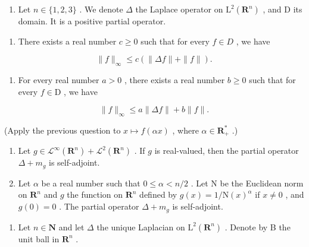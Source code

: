 \begin{enumerate}
\def\labelenumi{\arabic{enumi})}
\setcounter{enumi}{13}
\tightlist
\item
  Let \(n \in \{1, 2, 3\}\) . We denote \(\Delta\) the Laplace operator on \(\mathrm{L}^2(\mathbf{R}^n)\) , and D its domain. It is a positive partial operator.
\end{enumerate}

\begin{enumerate}
\def\labelenumi{\alph{enumi})}
\tightlist
\item
  There exists a real number \(c \geqslant 0\) such that for every \(f \in D\) , we have
\end{enumerate}

\[
\| f \| _ {\infty} \leqslant c (\| \Delta f \| + \| f \|).
\]

\begin{enumerate}
\def\labelenumi{\alph{enumi})}
\setcounter{enumi}{1}
\tightlist
\item
  For every real number \(a > 0\) , there exists a real number \(b \geqslant 0\) such that for every \(f \in \mathrm{D}\) , we have
\end{enumerate}

\[
\| f \| _ {\infty} \leqslant a \| \Delta f \| + b \| f \|.
\]

(Apply the previous question to \(x \mapsto f(\alpha x)\) , where \(\alpha \in \mathbf{R}_{+}^{*}\) .)

\begin{enumerate}
\def\labelenumi{\alph{enumi})}
\setcounter{enumi}{2}
\item
  Let \(g \in \mathcal{L}^{\infty}(\mathbf{R}^{n}) + \mathcal{L}^{2}(\mathbf{R}^{n})\) . If \(g\) is real-valued, then the partial operator \(\Delta + m_{g}\) is self-adjoint.
\item
  Let \(\alpha\) be a real number such that \(0 \leqslant \alpha < n/2\) . Let N be the Euclidean norm on \(\mathbf{R}^n\) and \(g\) the function on \(\mathbf{R}^n\) defined by \(g(x) = 1/\mathrm{N}(x)^\alpha\) if \(x \neq 0\) , and \(g(0) = 0\) . The partial operator \(\Delta + m_g\) is self-adjoint.
\end{enumerate}

\begin{enumerate}
\def\labelenumi{\arabic{enumi})}
\setcounter{enumi}{14}
\tightlist
\item
  Let \(n \in \mathbf{N}\) and let \(\Delta\) the unique Laplacian on \(\mathrm{L}^2(\mathbf{R}^n)\) . Denote by B the unit ball in \(\mathbf{R}^n\) .
\end{enumerate}

